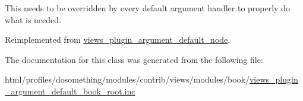 This needs to be overridden by every default argument handler to properly do what is needed. 

Reimplemented from \hyperlink{classviews__plugin__argument__default__node_a1191e03f5150b371f2fc5911726a4b60}{views\_\-plugin\_\-argument\_\-default\_\-node}.

The documentation for this class was generated from the following file:\begin{DoxyCompactItemize}
\item 
html/profiles/dosomething/modules/contrib/views/modules/book/\hyperlink{views__plugin__argument__default__book__root_8inc}{views\_\-plugin\_\-argument\_\-default\_\-book\_\-root.inc}\end{DoxyCompactItemize}
